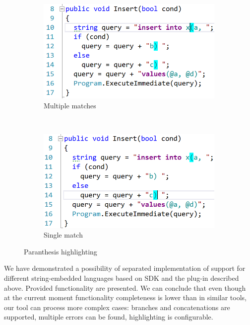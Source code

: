 \documentclass{acm_proc_article-sp}
\begin{document}
\begin{figure}[h!]
  \begin{center}
    \begin{subfigure}[t]{0.2\textwidth}    
        \includegraphics[scale=0.25]{graphics/bracket_1.png}    
    \caption{Multiple matches}
    \label{brace1}
    \end{subfigure}
    ~
    \begin{subfigure}[t]{0.2\textwidth}      
            \includegraphics[scale=0.25]{graphics/bracket_3.png}        
        \caption{Single match}
        \label{brace2}
    \end{subfigure}
    \caption{Paranthesis highlighting}
    \label{braces}
  \end{center}
\end{figure}

We have demonstrated a possibility of separated implementation of support for different string-embedded languages based on SDK and the plug-in described above. Provided functionality are presented. We can conclude that even though at the current moment functionality completeness is lower than in similar tools, our tool can process more complex cases: branches and concatenations are supported, multiple errors can be found, highlighting is configurable.
\end{document}
